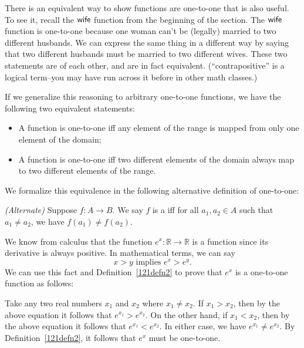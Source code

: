 There is an equivalent way to show functions are one-to-one that is also useful.  To see it, recall the $\sf{wife}$ function from the beginning of the section.  The $\sf{wife}$ function is one-to-one because one woman can't be (legally) married to two different husbands. We can express the same thing in a different way by saying that two different husbands must be married to two different wives. These two statements are  of each other, and are in fact equivalent.  (``contrapositive'' is a logical term--you may have run across it before in other math classes.)
 
If we generalize this reasoning to arbitrary one-to-one functions, we have the following two equivalent statements:
\begin{itemize}
\item
A function is one-to-one iff any element of the range is mapped from only one element of the domain;
\item
A function is one-to-one iff two different elements of the domain always map to two different elements of the range.
\end{itemize}

We formalize this equivalence in the following alternative definition of one-to-one:

\begin{defn} \label{121defn2}\emph{(Alternate)}
Suppose $f \colon A \to B$. We say $f$ is a  iff for all $a_1,a_2 \in A$  such that $a_1 \neq a_2$, we have $f(a_1) \neq f(a_2)$. 
\end{defn}

\begin{example}{}  We know from calculus that the function $e^x: \mathbb{R} \rightarrow \mathbb{R}$ is a  function since its derivative is always positive.  In mathematical terms, we can say
\[ x > y \text{ implies  } e^x > e^y.\]
We can use this fact and Definition~\ref{121defn2} to prove that $e^x$  is a one-to-one function as follows:

Take any two real numbers $x_1$ and $x_2$ where $x_1 \neq x_2$. If $x_1 > x_2$, then by the above equation it follows that $e^{x_1} > e^{x_2}$. On the other hand, 
if $x_1 < x_2$, then by the above equation it follows that $e^{x_1} < e^{x_2}$.  In either case, we have  $e^{x_1} \neq e^{x_2}$. By Definition~\ref{121defn2}, it follows that $e^x$ must be one-to-one.
\end{example}

